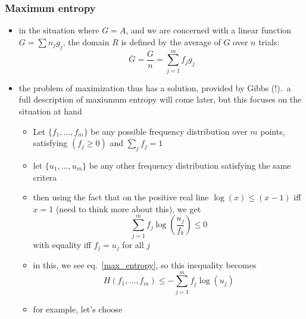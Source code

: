 \documentclass[../jaynes_prob_theory_notes.tex]{subfiles}
\begin{document}
                \subsubsection{Maximum entropy}
                    \begin{itemize}
                        \item in the situation where $G = A$, and we are concerned with a linear function $G = \sum n_j g_j$, the domain $R$ is defined by the average of $G$ over $n$ trials:
                            \begin{equation*}
                                \overline{G} = \frac{G}{n} = \sum\limits^{m}_{j=1}f_j g_j
                            \end{equation*}
                        \item the problem of maximization thus has a solution, provided by Gibbs (!).\ a full description of maxiumum entropy will come later, but this focuses on the situation at hand
                            \begin{itemize}
                                \item Let  $\{ f_1, \ldots, f_m \}$ be any possible frequency distribution over $m$ points, satisfying $(f_j \geq 0)$ and $\sum_j f_j = 1$
                                \item let $\{ u_1, \ldots, u_m \}$ be any other frequency distribution satisfying the same critera
                                \item then using the fact that on the positive real line $\log (x) \leq (x-1)$ iff $x=1$ (need to think more about this), we get
                                    \begin{equation*}
                                        \sum\limits^{m}_{j=1} f_j \log \left( \frac{u_j}{f_k} \right) \leq 0
                                    \end{equation*}
                                    with equality iff $f_j = u_j$ for all $j$
                                \item in this, we see eq.~\ref{max_entropy}, so this inequality becomes
                                    \begin{equation*}
                                        H(f_1, \ldots, f_m) \leq - \sum\limits^{m}_{j=1} f_j \log (u_j)
                                    \end{equation*}
                                \item for example, let's choose 
                                    \begin{equation*}

\end{equation*}
\end{itemize}
\end{itemize}
\end{document}
